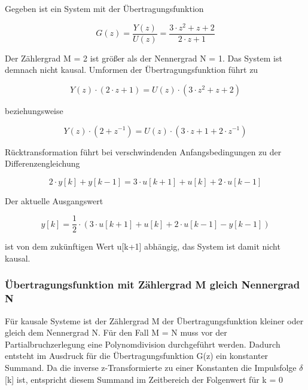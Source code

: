 \noindent Gegeben ist ein System mit der \"{U}bertragungsfunktion

\begin{equation}\label{eq:sixseightyone}
G\left(z\right)=\frac{Y\left(z\right)}{U\left(z\right)} =\frac{3\cdot z^{2} +z+2}{2\cdot z+1}
\end{equation}

\noindent Der Z\"{a}hlergrad M = 2 ist gr\"{o}{\ss}er als der Nennergrad N = 1. Das System ist demnach nicht kausal. Umformen der \"{U}bertragungsfunktion f\"{u}hrt zu

\begin{equation}\label{eq:sixseightytwo}
Y\left(z\right)\cdot \left(2\cdot z+1\right)=U\left(z\right)\cdot \left(3\cdot z^{2} +z+2\right)
\end{equation}

\noindent beziehungsweise

\begin{equation}\label{eq:sixseightythree}
Y\left(z\right)\cdot \left(2+z^{-1} \right)=U\left(z\right)\cdot \left(3\cdot z+1+2\cdot z^{-1} \right)
\end{equation}

\noindent R\"{u}cktransformation f\"{u}hrt bei verschwindenden Anfangsbedingungen zu der Differenzengleichung

\begin{equation}\label{eq:sixseightyfour}
2\cdot y\left[k\right]+y\left[k-1\right]=3\cdot u\left[k+1\right]+u\left[k\right]+2\cdot u\left[k-1\right]
\end{equation}

\noindent Der aktuelle Ausgangswert

\begin{equation}\label{eq:sixseightyfive}
y\left[k\right]=\frac{1}{2} \cdot \left(3\cdot u\left[k+1\right]+u\left[k\right]+2\cdot u\left[k-1\right]-y\left[k-1\right]\right)
\end{equation}

\noindent ist von dem zuk\"{u}nftigen Wert u[k+1] abh\"{a}ngig, das System ist damit nicht kausal.

\subsubsection{\"{U}bertragungsfunktion mit Z\"{a}hlergrad M gleich Nennergrad N}

\noindent F\"{u}r kausale Systeme ist der Z\"{a}hlergrad M der \"{U}bertragungsfunktion kleiner oder gleich dem Nennergrad N. F\"{u}r den Fall M = N muss vor der Partialbruchzerlegung eine Polynomdivision durchgef\"{u}hrt werden. Dadurch entsteht im Ausdruck f\"{u}r die \"{U}bertragungsfunktion G(z) ein konstanter Summand. Da die inverse z-Transformierte zu einer Konstanten die Impulsfolge $\delta$[k] ist, entspricht diesem Summand im Zeitbereich der Folgenwert f\"{u}r k = 0

